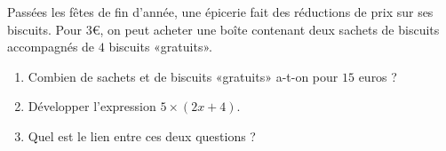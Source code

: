 
\begin{exercice}\label{exo2smath-0087}

Passées les fêtes de fin d'année, une épicerie fait des réductions de prix sur ses biscuits. Pour \( 3\)€, on peut acheter une boîte contenant deux sachets de biscuits accompagnés de \( 4\) biscuits «gratuits».
\begin{enumerate}
    \item
        Combien de sachets et de biscuits «gratuits» a-t-on pour \( 15\) euros ?
    \item
        Développer l'expression \( 5\times(2x+4)\).
    \item
        Quel est le lien entre ces deux questions ?
\end{enumerate}

\end{exercice}
